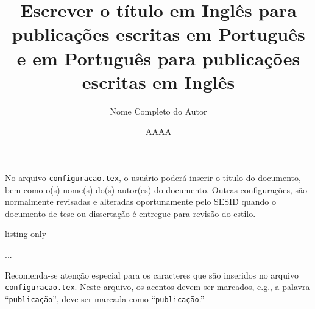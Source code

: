 No arquivo {\tt configuracao.tex}, o usuário poderá inserir o título do documento, bem como o(s) nome(s) do(s) autor(es) do documento. Outras configurações, são normalmente revisadas e alteradas oportunamente pelo SESID quando o documento de tese ou dissertação é entregue para revisão do estilo.

\begin{texexp}{listing only}
\title{Escrever o t\'{i}tulo em Ingl\^{e}s para publicaç\~{o}es
escritas em Portugu\^{e}s e em Portugu\^{e}s para publicaç\~{o}es
escritas em Ingl\^{e}s} 
\author{Nome Completo do Autor}
\date{AAAA}
...
\end{texexp}

\begin{marker}
Recomenda-se atenção especial para os caracteres que são inseridos no arquivo {\tt configuracao.tex}. Neste arquivo, os acentos devem ser marcados, e.g., a palavra ``{\tt publicação}'', deve ser marcada como ``\texttt{publicaç\~{a}o}.''
\end{marker}

